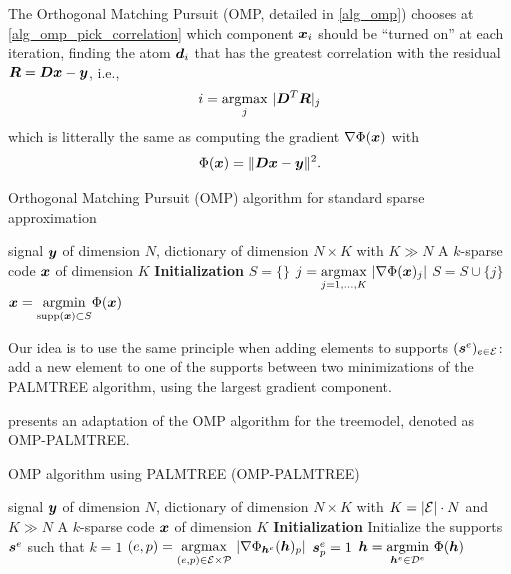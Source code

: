 The Orthogonal Matching Pursuit (\ac{OMP}, detailed in \cref{alg_omp}) chooses at \cref{alg_omp_pick_correlation} which component $\bm{x}_i$ should be “turned on” at each iteration, finding the atom $\bm{d}_i$ that has the greatest correlation with the residual $\bm{R} = \bm{D}\bm{x} - \bm{y}$, i.e.,
\begin{equation*} i = \underset{j}{\operatorname*{\arg\!\max}} ~ | \bm{D}^T \bm{R} |_j \end{equation*}
which is litterally the same as computing the gradient $\nabla \Phi(\bm{x})$ with \begin{equation*}\Phi(\bm{x}) = \lVert \bm{D}\bm{x} - \bm{y} \rVert^2.\end{equation*}

\begin{algorithm}[!ht]
    \caption{Orthogonal Matching Pursuit (OMP) algorithm for standard sparse approximation}\label{alg_omp}
  \begin{algorithmic}[1]
    \Input signal $\bm{y}$ of dimension $N$, dictionary of dimension $N \times K$ with $K \gg N$
    \Output A $k$-sparse code $\bm{x}$ of dimension $K$
    \State \textbf{Initialization} $S=\{\}$
      \State $j =  \underset{j = 1,\dots,K}{\operatorname*{\arg\!\max}}~| \nabla \Phi(\bm{x})_j |$\label{alg_omp_pick_correlation}
      \State $S = S \cup \{j\}$
      \State $\bm{x} = \underset{\text{supp}(\bm{x}) \subset S}{\operatorname{argmin}} \Phi(\bm{x})$
    \EndFor
  \end{algorithmic}
\end{algorithm}

Our idea is to use the same principle when adding elements to supports $(\bm{s}^e)_{e \in \mathcal E}$: add a new element to one of the supports between two minimizations of the \ac{PALMTREE} algorithm, using the largest gradient component.

\noindent
{} presents an adaptation of the \ac{OMP} algorithm for the \gls{treemodel}, denoted as OMP-PALMTREE.

\begin{algorithm}[!ht]
    \caption{\ac{OMP} algorithm using \ac{PALMTREE} (OMP-PALMTREE)}\label{alg_omppalmtree}
  \begin{algorithmic}[1]
    \Input signal $\bm{y}$ of dimension $N$, dictionary of dimension $N \times K$ with $K = |\mathcal E| \cdot N$ and $K \gg N$
    \Output A $k$-sparse code $\bm{x}$ of dimension $K$
    \State \textbf{Initialization} Initialize the supports $\bm{s}^e$ such that $k=1$
      \State $(e,p) = \underset{(e,p) \in \mathcal E \times \mathcal P}{\operatorname*{\arg\!\max}}~ |\nabla \Phi_{\bm{h}^e}(\bm{h})_p|$\label{alg_omppalmtree_find}
      \State $\bm{s}^e_p = 1$
      \State $\bm{h} = \underset{\bm{h}^e \in {\mathcal D}^e}{\operatorname{argmin}}~ \Phi(\bm{h})$ \label{alg_omppalmtree_ftl}
    \EndFor
  \end{algorithmic}
\end{algorithm}

